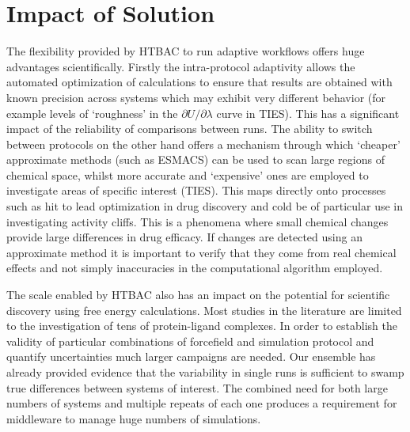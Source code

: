 \documentclass[conference]{IEEEtran}
\begin{document}


\section{Impact of Solution}\label{sec:impact}


The flexibility provided by HTBAC to run adaptive workflows offers huge advantages scientifically.
Firstly the intra-protocol adaptivity allows the automated optimization of calculations to ensure that
results are obtained with known precision across systems which may exhibit very different behavior (for example levels of `roughness' in the $\partial U/\partial\lambda$ curve in TIES).
This has a significant impact of the reliability of comparisons between runs.
The ability to switch between protocols on the other hand offers a mechanism through which `cheaper' approximate methods (such as ESMACS) can be used to scan large regions of chemical space, whilst more accurate and `expensive' ones are employed to investigate areas of specific interest (TIES).
This maps directly onto processes such as hit to lead optimization in drug discovery and cold be of particular use in investigating activity cliffs.
This is a phenomena where small chemical changes provide large differences in drug efficacy.
If changes are detected using an approximate method it is important to verify that they come from
real chemical effects and not simply inaccuracies in the computational algorithm employed.

The scale enabled by HTBAC also has an impact on the potential for scientific discovery using free energy calculations.
Most studies in the literature are limited to the investigation of tens of protein-ligand complexes.
In order to establish the validity of particular combinations of forcefield and simulation protocol and
quantify uncertainties much larger campaigns are needed.
Our ensemble has already provided evidence that the variability in single runs is sufficient to
swamp true differences between systems of interest.
The combined need for both large numbers of systems and multiple repeats of each one produces a requirement
for middleware to manage huge numbers of simulations.
\end{document}
